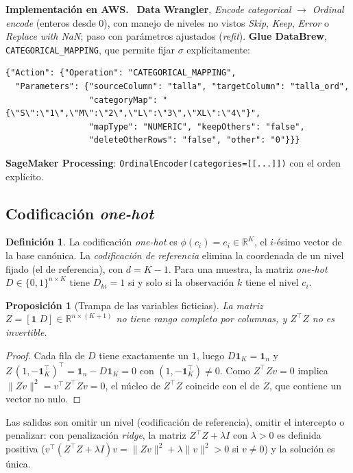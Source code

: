 \documentclass[11pt,a4paper]{article}
\theoremstyle{plain}
\newtheorem{proposicion}[teorema]{Proposición}
\theoremstyle{definition}
\newtheorem{definicion}[teorema]{Definición}
\theoremstyle{remark}
\newcommand{\R}{\mathbb{R}}
\newcommand{\1}{\mathbf{1}}
\newenvironment{aws}{\par\medskip\sloppy\noindent\textbf{Implementación en AWS.}\ }{\par\medskip}
\begin{document}
\begin{aws}
\textbf{Data Wrangler}, \emph{Encode categorical} $\to$ \emph{Ordinal
encode} (enteros desde $0$), con manejo de niveles no vistos \emph{Skip},
\emph{Keep}, \emph{Error} o \emph{Replace with NaN}; paso con parámetros
ajustados (\emph{refit}). \textbf{Glue DataBrew},
\texttt{CATEGORICAL\_MAPPING}, que permite fijar $\sigma$ explícitamente:
\begin{lstlisting}
{"Action": {"Operation": "CATEGORICAL_MAPPING",
  "Parameters": {"sourceColumn": "talla", "targetColumn": "talla_ord",
                 "categoryMap": "{\"S\":\"1\",\"M\":\"2\",\"L\":\"3\",\"XL\":\"4\"}",
                 "mapType": "NUMERIC", "keepOthers": "false",
                 "deleteOtherRows": "false", "other": "0"}}}
\end{lstlisting}
\textbf{SageMaker Processing}: \texttt{OrdinalEncoder(categories=[[...]])}
con el orden explícito.
\end{aws}

\subsection{Codificación \emph{one-hot}}\label{sec:onehot}

\begin{definicion}
La codificación \emph{one-hot} es $\phi(c_i)=e_i\in\R^K$, el $i$-ésimo
vector de la base canónica. La \emph{codificación de referencia} elimina
la coordenada de un nivel fijado (el de referencia), con $d=K-1$. Para una
muestra, la matriz \emph{one-hot} $D\in\{0,1\}^{n\times K}$ tiene
$D_{ki}=1$ si y solo si la observación $k$ tiene el nivel $c_i$.
\end{definicion}

\begin{proposicion}[Trampa de las variables ficticias]\label{prop:trampa}
La matriz $Z=[\1\;D]\in\R^{n\times(K+1)}$ no tiene rango completo por
columnas, y $Z^\top Z$ no es invertible.
\end{proposicion}

\begin{proof}
Cada fila de $D$ tiene exactamente un $1$, luego $D\1_K=\1_n$ y
$Z\,(1,-\1_K^\top)^\top=\1_n-D\1_K=0$ con $(1,-\1_K^\top)\ne0$. Como
$Z^\top Zv=0$ implica $\|Zv\|^2=v^\top Z^\top Zv=0$, el núcleo de
$Z^\top Z$ coincide con el de $Z$, que contiene un vector no nulo.
\end{proof}

Las salidas son omitir un nivel (codificación de referencia), omitir el
intercepto o penalizar: con penalización \emph{ridge}, la matriz $Z^\top
Z+\lambda I$ con $\lambda>0$ es definida positiva ($v^\top(Z^\top
Z+\lambda I)v=\|Zv\|^2+\lambda\|v\|^2>0$ si $v\ne0$) y la solución es única.
\end{document}
